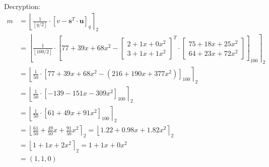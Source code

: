 Decryption:
\begin{align*}
  m & = \left\lfloor \frac{1}{\left\lfloor q/2\right\rfloor} \cdot\left[v-\textbf{s}^T \cdot \textbf{u}\right]_{q}\right\rceil _2           \\
    & = \left\lfloor \frac{1}{\left\lfloor 100/2\right\rfloor} \cdot \left[77+39x+68x^2-
    \begin{bmatrix}2+ 1x + 0x^2 \\ 3+1x+1x^2 \end{bmatrix}^T
    \cdot
  \begin{bmatrix}75+18x+25x^2 \\ 64+23x+72x^2 \end{bmatrix} \right]_{100}\right\rceil _2                                             \\
    & = \left\lfloor \frac{1}{50} \cdot \left[77+39x+68x^2-(216+190x+377x^2)\right]_{100}\right\rceil _2                             \\
    & = \left\lfloor \frac{1}{50} \cdot \left[-139-151x-309x^2\right]_{100}\right\rceil _2                                           \\
    & = \left\lfloor \frac{1}{50} \cdot \left[61+49x+91x^2\right]_{100} \right\rceil _2                                              \\
    & = \left\lfloor \frac{61}{50} +\frac{49}{50}x+\frac{91}{50}x^2\right\rceil _2  = \left\lfloor 1.22+0.98x+1.82x^2\right\rceil _2 \\
    & = \left\lfloor1+1x+2x^2\right\rceil _2 =           1+1x+0x^2                                                                   \\
    & = (1,1,0)
\end{align*}